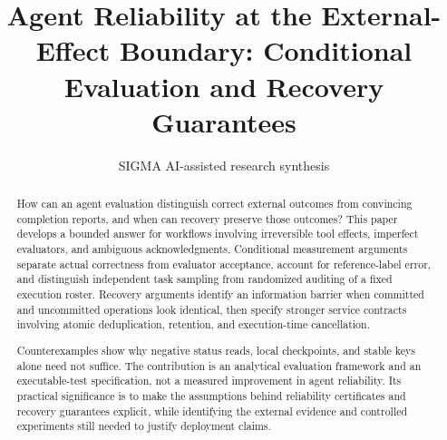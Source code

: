 \documentclass[11pt]{article}
\title{Agent Reliability at the External-Effect Boundary: Conditional Evaluation and Recovery Guarantees}
\date{}
\author{SIGMA AI-assisted research synthesis}
\begin{document}
\maketitle

\begin{abstract}
How can an agent evaluation distinguish correct external outcomes from convincing completion reports, and when can recovery preserve those outcomes? This paper develops a bounded answer for workflows involving irreversible tool effects, imperfect evaluators, and ambiguous acknowledgments. Conditional measurement arguments separate actual correctness from evaluator acceptance, account for reference-label error, and distinguish independent task sampling from randomized auditing of a fixed execution roster. Recovery arguments identify an information barrier when committed and uncommitted operations look identical, then specify stronger service contracts involving atomic deduplication, retention, and execution-time cancellation.

Counterexamples show why negative status reads, local checkpoints, and stable keys alone need not suffice. The contribution is an analytical evaluation framework and an executable-test specification, not a measured improvement in agent reliability. Its practical significance is to make the assumptions behind reliability certificates and recovery guarantees explicit, while identifying the external evidence and controlled experiments still needed to justify deployment claims.
\end{abstract}
\begingroup\setlength{\fboxsep}{10pt}
\noindent{}\endgroup\par\medskip
\end{document}
